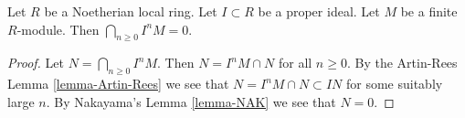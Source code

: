 \begin{lemma}
\label{lemma-intersect-powers-ideal-module-zero}
Let $R$ be a Noetherian local ring. Let $I \subset R$ be
a proper ideal. Let $M$ be a finite $R$-module.
Then $\bigcap_{n \geq 0} I^nM = 0$.
\end{lemma}

\begin{proof}
Let $N = \bigcap_{n \geq 0} I^nM$.
Then $N = I^nM \cap N$ for all $n \geq 0$.
By the Artin-Rees Lemma \ref{lemma-Artin-Rees}
we see that $N = I^nM \cap N \subset IN$ for
some suitably large $n$. By Nakayama's Lemma \ref{lemma-NAK}
we see that $N = 0$.
\end{proof}